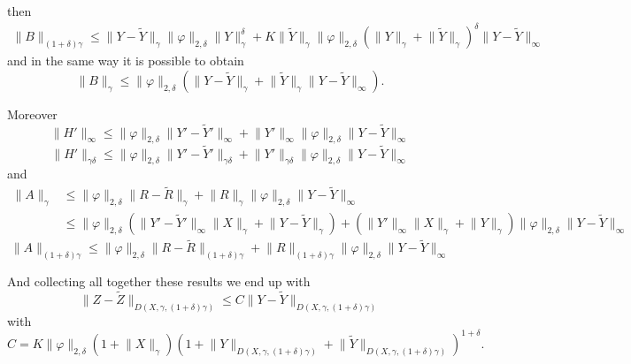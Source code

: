 \documentclass[a4paper,12pt,reqno]{amsproc}
\newcommand{\norm}[1]{\lVert #1\rVert}
\begin{document}
then
\begin{equation*}
  \begin{split}
\norm{B}_{(1+\delta)\gamma} \le  \norm{Y-\widetilde Y}_\gamma
\norm{\varphi}_{2,\delta} \norm{Y}_\gamma^{\delta}  + K\norm{\widetilde
Y}_\gamma  \|\varphi\|_{2,\delta} (\norm{Y}_{\gamma}+\norm{\widetilde
  Y}_{\gamma})^{\delta} \norm{Y-\widetilde Y}_\infty     
  \end{split}
\end{equation*}
and in the same way it is possible to obtain 
\begin{equation*}
\norm{B}_{\gamma} \le \|\varphi\|_{2,\delta}( \norm{Y-\widetilde Y}_\gamma
  + \norm{\widetilde
Y}_\gamma   \norm{Y-\widetilde Y}_\infty) .
\end{equation*}

Moreover
\begin{equation*}
  \norm{H'}_{\infty} \le \|\varphi\|_{2,\delta}
  \norm{Y'-\widetilde Y'}_{\infty} + \norm{Y'}_{\infty}
  \|\varphi\|_{2,\delta} \norm{Y-\widetilde Y}_{\infty}
\end{equation*}
\begin{equation*}
  \norm{H'}_{\gamma\delta} \le \|\varphi\|_{2,\delta}
  \norm{Y'-\widetilde Y'}_{\gamma\delta} + \norm{Y'}_{\gamma\delta}
  \|\varphi\|_{2,\delta} \norm{Y-\widetilde Y}_{\infty}
\end{equation*}
and
\begin{equation*}
  \begin{split}
  \norm{A}_{\gamma}& \le
 \|\varphi\|_{2,\delta}
  \norm{R-\widetilde R}_{\gamma} + \norm{R}_{\gamma}
  \|\varphi\|_{2,\delta} \norm{Y-\widetilde Y}_{\infty}    
\\ & \le
 \|\varphi\|_{2,\delta}
 ( \norm{Y'-\widetilde Y'}_{\infty}\norm{X}_\gamma+\norm{Y-\widetilde
 Y}_{\gamma}) + (\norm{Y'}_\infty \norm{X}_{\gamma}+\norm{Y}_{\gamma})
  \|\varphi\|_{2,\delta} \norm{Y-\widetilde Y}_{\infty}    
  \end{split}
\end{equation*}
\begin{equation*}
  \norm{A}_{(1+\delta)\gamma}\le
 \|\varphi\|_{2,\delta}
  \norm{R-\widetilde R}_{(1+\delta)\gamma} + \norm{R}_{(1+\delta)\gamma}
  \|\varphi\|_{2,\delta} \norm{Y-\widetilde Y}_{\infty}
\end{equation*}

And collecting all together these results we end up with
\begin{equation*}
 \norm{Z-\widetilde Z}_{D(X,\gamma,(1+\delta)\gamma)} \le C \norm{Y-\widetilde Y}_{D(X,\gamma,(1+\delta)\gamma)} 
\end{equation*}
with 
$$
C =  K
 \norm{\varphi}_{2,\delta} (1+\norm{X}_\gamma)
 (1+\norm{Y}_{D(X,\gamma,(1+\delta)\gamma)}+\norm{\widetilde Y}_{D(X,\gamma,(1+\delta)\gamma)})^{1+\delta}.
$$
\end{document}
